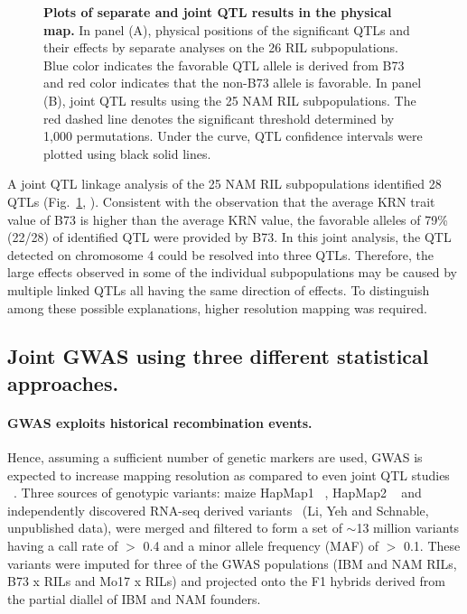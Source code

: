 \documentclass[10pt,letterpaper]{article}
\begin{document}
\begin{figure}[h]
\caption{{\bf Plots of separate and joint QTL results in the physical map.}
In panel (A), physical positions of the significant QTLs and their effects by separate analyses on the 26 RIL subpopulations. Blue color indicates the favorable QTL allele is derived from B73 and red color indicates that the non-B73 allele is favorable. In panel (B), joint QTL results using the 25 NAM RIL subpopulations. The red dashed line denotes the significant threshold determined by 1,000 permutations. Under the curve, QTL confidence intervals were plotted using black solid lines.}
\label{fig2}
\end{figure}


A joint QTL linkage analysis of the 25 NAM RIL subpopulations identified 28 QTLs (Fig.~\ref{fig2}, ). Consistent with the observation that the average KRN trait value of B73 is higher than the average KRN value, the favorable alleles of 79\% (22/28) of identified QTL were provided by B73. In this joint analysis, the QTL detected on chromosome 4 could be resolved into three QTLs. Therefore, the large effects observed in some of the individual subpopulations may be caused by multiple linked QTLs all having the same direction of effects. To distinguish among these possible explanations, higher resolution mapping was required.

\subsection*{Joint GWAS using three different statistical approaches.}
\paragraph{GWAS exploits historical recombination events.}
Hence, assuming a sufficient number of genetic markers are used, GWAS is expected to increase mapping resolution as compared to even joint QTL studies ~\cite{Yu2008}. Three sources of genotypic variants: maize HapMap1 ~\cite{Gore2009}, HapMap2 ~\cite{Chia2012} and independently discovered RNA-seq derived variants ~\cite{Barbazuk2007}(Li, Yeh and Schnable, unpublished data), were merged and filtered to form a set of $\sim$13 million variants having a call rate of  $>$ 0.4 and a minor allele frequency (MAF) of  $>$ 0.1. These variants were imputed for three of the GWAS populations (IBM and NAM RILs, B73 x RILs and Mo17 x RILs) and projected onto the F1 hybrids derived from the partial diallel of IBM and NAM founders. 
\end{document}
